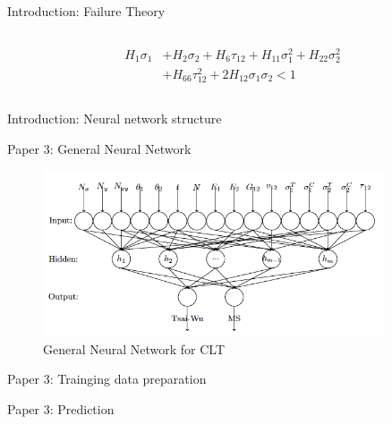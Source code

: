 \documentclass{beamer}
\begin{document}
\begin{frame}{Introduction: Failure Theory }
\begin{columns}[c]
\begin{column}{0.6\textwidth}
\begin{itemize}
		 \begingroup
		 \small
		 \begin{equation*} 
		 \begin{split}
			H_1 \sigma_1  & + H_2 \sigma_2 + H_6 \tau_{12} + H_{11}\sigma_1^2 + H_{22} \sigma_2^2 \\
						  & + H_{66}  \tau_{12}^2 + 2H_{12}\sigma_1\sigma_2 < 1
		 \end{split}
		\end{equation*}
		\endgroup
		\end{itemize}
    \end{column}
\end{columns}
\end{frame}

\begin{frame}{Introduction: Neural network structure}
	
\end{frame}

\begin{frame}{Paper 3: General Neural Network}
	\begin{figure}
		\includegraphics[width=0.9\textwidth]{fig/a0_figure_ann_for_clt_architecture.png}
		\caption{General Neural Network for CLT}
	\end{figure}
\end{frame}

\begin{frame}{Paper 3: Trainging data preparation}
	
\end{frame}

\begin{frame}{Paper 3: Prediction}
	
\end{frame}
\end{document}
